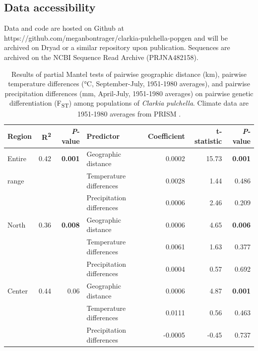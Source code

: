 \documentclass{article}
\begin{document}
\subsection*{Data accessibility}

Data and code are hosted on Github at https://github.com/meganbontrager/clarkia-pulchella-popgen and will be archived on Dryad or a similar repository upon publication. Sequences are archived on the NCBI Sequence Read Archive (PRJNA482158).

\clearpage




\clearpage

\begin{table}[ht]
\centering
\caption[Results of partial Mantel tests of pairwise differences]{Results of partial Mantel tests of pairwise geographic distance (km), pairwise temperature differences (\si{\degree}C, September-July, 1951-1980 averages), and pairwise precipitation differences (mm, April-July, 1951-1980 averages) on pairwise genetic differentiation (F\textsubscript{ST}) among populations of \textit{Clarkia pulchella}. Climate data are 1951-1980 averages from PRISM \citep{PRISM}.}
\label{mantel}
\begin{tabular}{lrrlrrr}
\toprule
Region & R\textsuperscript{2}	& \textit{P}-value & Predictor & Coefficient & t-statistic & \textit{P}-value \\
\midrule
Entire  &	0.42 &	\textbf{0.001} &	Geographic distance &	0.0002 &	15.73 &	\textbf{0.001} \\
range	&	&	& Temperature differences &	0.0028 &	1.44 &	0.486 \\
	&	&	& Precipitation differences &	0.0006 &	2.46 &	0.209 \\
\midrule
North	& 0.36 &	\textbf{0.008} &	Geographic distance &	0.0006 &	4.65 &	\textbf{0.006} \\
	&	&	&	Temperature differences &	0.0061 &	1.63 &	0.377 \\
	&	&	&	Precipitation differences &	0.0004 &	0.57 &	0.692 \\
\midrule
Center &	0.44 &	0.06 &	Geographic distance &	0.0006 &	4.87 &	\textbf{0.001} \\
	&	&	&	Temperature differences &	0.0111 &	0.56 &	0.463 \\
	&	&	&	Precipitation differences &	-0.0005 &	-0.45 &	0.737 \\
\bottomrule
\end{tabular}
\end{table}
\end{document}
